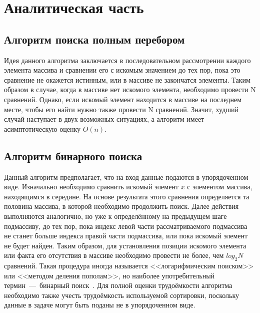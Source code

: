\chapter{Аналитическая часть}
\section{Алгоритм поиска полным перебором}
Идея данного алгоритма заключается в последовательном рассмотрении каждого элемента массива и сравнении его с искомым значением до тех пор, пока это сравнение не окажется истинным, или в массиве не закончатся элементы. Таким образом в случае, когда в массиве нет искомого элемента, необходимо провести N сравнений. Однако, если искомый элемент находится в массиве на последнем месте, чтобы его найти нужно также провести N сравнений. Значит, худший случай наступает в двух возможных ситуациях, а алгоритм имеет асимптотическую оценку $O(n)$.

\section{Алгоритм бинарного поиска}
Данный алгоритм предполагает, что на вход данные подаются в упорядоченном виде.
Изначально необходимо сравнить искомый элемент $x$ с элементом массива, находящимся в середине. На основе результата этого сравнения определяется та половина массива, в которой необходимо продолжить поиск. Далее действия выполняются аналогично, но уже к определённому на предыдущем шаге подмассиву, до тех пор, пока индекс левой части рассматриваемого подмассива не станет больше индекса правой части подмассива, или пока искомый элемент не будет найден. Таким образом, для установления позиции искомого элемента или факта его отсутствия в массиве необходимо провести не более, чем $log_{2}{N}$ сравнений. Такая процедура иногда называется <<логарифмическим поиском>> или <<методом деления пополам>>, но наиболее употребительный термин~---~бинарный поиск~\cite{book_knut}. Для полной оценки трудоёмкости алгоритма необходимо также учесть трудоёмкость используемой сортировки, поскольку данные в задаче могут быть поданы не в упорядоченном виде. 
